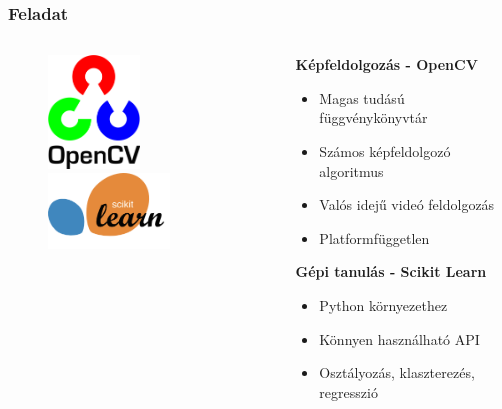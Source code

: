 \documentclass{beamer}
\begin{document}
\begin{frame}[fragile]
\frametitle{Feladat}

\begin{columns}
    \begin{column}{4cm}
		\begin{figure}[htb]
			\includegraphics[height=3cm]{images/OpenCV-logo.png}
			
			\bigskip
			
			\includegraphics[height=2cm]{images/scikit-learn-logo.png}
		\end{figure}
    \end{column}

    \begin{column}{7cm}
    		\textbf{Képfeldolgozás - OpenCV} \cite{bradski2008learning}
		\begin{itemize}
    			\item Magas tudású függvénykönyvtár
    			\item Számos képfeldolgozó algoritmus
    			\item Valós idejű videó feldolgozás
			\item Platformfüggetlen
		\end{itemize}
		\bigskip
		\textbf{Gépi tanulás - Scikit Learn} \cite{pedregosa2011scikit}
		\begin{itemize}
    			\item Python környezethez
    			\item Könnyen használható API
    			\item Osztályozás, klaszterezés, regresszió
		\end{itemize}
    \end{column}
\end{columns}

\end{frame}
\end{document}

